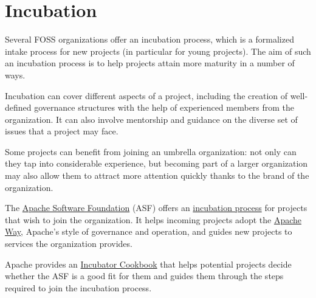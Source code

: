 


\chapter{Incubation}

Several FOSS organizations offer an incubation process, which is a formalized intake process for new projects (in particular for young projects).  The aim of such an incubation process is to help projects attain more maturity in a number of ways.

Incubation can cover different aspects of a project, including the creation of well-defined governance structures with the help of experienced members from the organization.  It can also involve mentorship and guidance on the diverse set of issues that a project may face.

Some projects can benefit from joining an umbrella organization: not only can they tap into considerable experience, but becoming part of a larger organization may also allow them to attract more attention quickly thanks to the brand of the organization.

\begin{kaobox}[frametitle=Apache Incubator]

The \href{https://apache.org/}{Apache Software Foundation} (ASF) offers an \href{https://incubator.apache.org/}{incubation process} for projects that wish to join the organization.  It helps incoming projects adopt the \href{https://apache.org/theapacheway/}{Apache Way}, Apache's style of governance and operation, and guides new projects to services the organization provides.

Apache provides an \href{https://incubator.apache.org/cookbook/}{Incubator Cookbook} that helps potential projects decide whether the ASF is a good fit for them and guides them through the steps required to join the incubation process.

\end{kaobox}

\newpage

